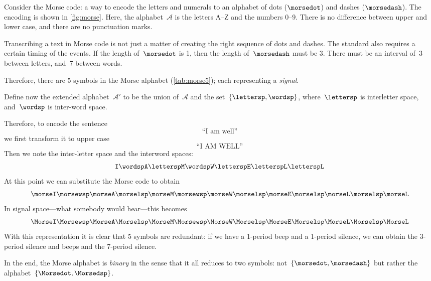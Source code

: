 \begin{example}
  Consider the Morse code: a way to encode the letters and numerals to an alphabet
  of dots ($\morsedot$) and dashes ($\morsedash$). The encoding is shown in \cref{fig:morse}.
  Here, the alphabet~$\mathcal{A}$ is the letters A--Z and the numbers 0--9.
  There is no difference between upper and lower case, and there are no punctuation marks.

  Transcribing a text in Morse code is not just a matter of creating the right sequence of dots and dashes.
  The standard also requires a certain timing of the events.
  If the length of~$\morsedot$ is 1, then the length of~$\morsedash$ must be 3.
  There must be an interval of~$3$ between letters, and~$7$ between words.

  Therefore, there are 5 symbols in the Morse alphabet (\cref{tab:morse5}); each representing a \emph{signal}.


  Define now the extended alphabet~$\mathcal{A}'$ to be the union of~$\mathcal{A}$ and the set~$\{\lettersp, \wordsp\}$, where~$\lettersp$ is interletter space, and~$\wordsp$ is inter-word space.

  Therefore, to encode the sentence
  \begin{equation*}
    \text{``I am well''}
  \end{equation*}
  we first transform it to upper case
  \begin{equation*}
    \text{``I AM WELL''}
  \end{equation*}
  Then we note the inter-letter space and the interword spaces:
  \begin{equation*}
    \texttt{I} \wordsp \texttt{A} \lettersp \texttt{M} \wordsp \texttt{W} \lettersp
    \texttt{E} \lettersp \texttt{L} \lettersp \texttt{L}
  \end{equation*}
  At this point we can substitute the Morse code to obtain
  \begin{equation*}
    \morseI \morsewsp \morseA \morselsp \morseM \morsewsp \morseW \morselsp \morseE \morselsp \morseL \morselsp \morseL
  \end{equation*}
  In signal space---what somebody would hear---this becomes
  \begin{equation*}
    \MorseI \Morsewsp \MorseA \Morselsp \MorseM \Morsewsp \MorseW \Morselsp \MorseE \Morselsp \MorseL \Morselsp \MorseL
  \end{equation*}
  With this representation it is clear that 5 symbols are redundant: if we have a 1-period beep and a 1-period silence, we can obtain the 3-period silence and beeps and the 7-period silence.

  In the end, the Morse alphabet is \emph{binary} in the sense that it all reduces to two symbols: not~$\{\morsedot, \morsedash\}$ but rather the alphabet~$\{\Morsedot, \Morsedsp\}$.
\end{example}

